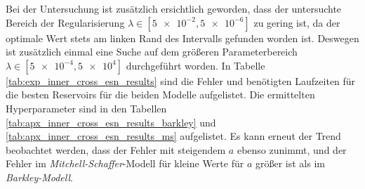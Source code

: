 Bei der Untersuchung ist zusätzlich ersichtlich geworden, dass der untersuchte Bereich der Regularisierung $\lambda \in [\num{5e-2},\num{5e-6}]$ zu gering ist, da der optimale Wert stets am linken Rand des Intervalls gefunden worden ist. Deswegen ist zusätzlich einmal eine Suche auf dem größeren Parameterbereich $\lambda \in [\num{5e-4},\num{5e+4}]$ durchgeführt worden.
In Tabelle \ref{tab:exp_inner_cross_esn_results} sind die Fehler und benötigten Laufzeiten für die besten Reservoirs für die beiden Modelle aufgelistet. Die ermittelten Hyperparameter sind in den Tabellen \ref{tab:apx_inner_cross_esn_results_barkley} und \ref{tab:apx_inner_cross_esn_results_ms} aufgelistet. Es kann erneut der Trend beobachtet werden, dass der Fehler mit steigendem $a$ ebenso zunimmt, und der Fehler im \textit{Mitchell-Schaffer}-Modell für kleine Werte für $a$ größer ist als im \textit{Barkley-Modell}.


